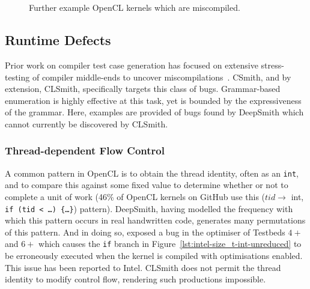 
\begin{figure}
  \centering %
  \\%
  \\%
  \caption[Further example kernels which are miscompiled]{%
    Further example OpenCL kernels which are miscompiled.%
  }%
\end{figure}


\subsection{Runtime Defects}

Prior work on compiler test case generation has focused on extensive stress-testing of compiler middle-ends to uncover miscompilations~\cite{Chen2014a}. CSmith, and by extension, CLSmith, specifically targets this class of bugs. Grammar-based enumeration is highly effective at this task, yet is bounded by the expressiveness of the grammar. Here, examples are provided of bugs found by DeepSmith which cannot currently be discovered by CLSmith.


\subsubsection{Thread-dependent Flow Control}

A common pattern in OpenCL is to obtain the thread identity, often as an \texttt{int}, and to compare this against some fixed value to determine whether or not to complete a unit of work (46\% of OpenCL kernels on GitHub use this ($tid \rightarrow$ int, \texttt{if (tid < \ldots) \{\ldots\}}) pattern). DeepSmith, having modelled the frequency with which this pattern occurs in real handwritten code, generates many permutations of this pattern. And in doing so, exposed a bug in the optimiser of Testbeds $4+$ and $6+$ which causes the \texttt{if} branch in Figure~\ref{lst:intel-size_t-int-unreduced} to be erroneously executed when the kernel is compiled with optimisations enabled. This issue has been reported to Intel. CLSmith does not permit the thread identity to modify control flow, rendering such productions impossible.

